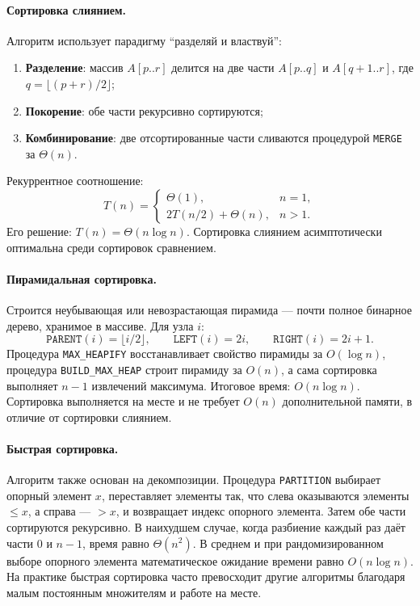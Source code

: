 \documentclass[a4paper,12pt]{article}
\begin{document}
\paragraph*{Сортировка слиянием.}
Алгоритм использует парадигму ``разделяй и властвуй'':
\begin{enumerate}
    \item \textbf{Разделение}: массив \(A[p..r]\) делится на две части \(A[p..q]\) и \(A[q+1..r]\), где \(q=\lfloor(p+r)/2\rfloor\);
    \item \textbf{Покорение}: обе части рекурсивно сортируются;
    \item \textbf{Комбинирование}: две отсортированные части сливаются процедурой \texttt{MERGE} за \(\Theta(n)\).
\end{enumerate}
Рекуррентное соотношение:
\[
T(n)=
\begin{cases}
\Theta(1), & n=1,\\
2T(n/2)+\Theta(n), & n>1.
\end{cases}
\]
Его решение: \(T(n)=\Theta(n\log n)\). Сортировка слиянием асимптотически оптимальна среди сортировок сравнением.

\paragraph*{Пирамидальная сортировка.}
Строится неубывающая или невозрастающая пирамида — почти полное бинарное дерево, хранимое в массиве. Для узла \(i\):
\[
\texttt{PARENT}(i)=\lfloor i/2\rfloor,\qquad
\texttt{LEFT}(i)=2i,\qquad
\texttt{RIGHT}(i)=2i+1.
\]
Процедура \texttt{MAX\_HEAPIFY} восстанавливает свойство пирамиды за \(O(\log n)\), процедура \texttt{BUILD\_MAX\_HEAP} строит пирамиду за \(O(n)\), а сама сортировка выполняет \(n-1\) извлечений максимума. Итоговое время: \(O(n\log n)\). Сортировка выполняется на месте и не требует \(O(n)\) дополнительной памяти, в отличие от сортировки слиянием.

\paragraph*{Быстрая сортировка.}
Алгоритм также основан на декомпозиции. Процедура \texttt{PARTITION} выбирает опорный элемент \(x\), переставляет элементы так, что слева оказываются элементы \(\le x\), а справа — \(>x\), и возвращает индекс опорного элемента. Затем обе части сортируются рекурсивно. В наихудшем случае, когда разбиение каждый раз даёт части \(0\) и \(n-1\), время равно \(\Theta(n^2)\). В среднем и при рандомизированном выборе опорного элемента математическое ожидание времени равно \(O(n\log n)\). На практике быстрая сортировка часто превосходит другие алгоритмы благодаря малым постоянным множителям и работе на месте.
\end{document}
